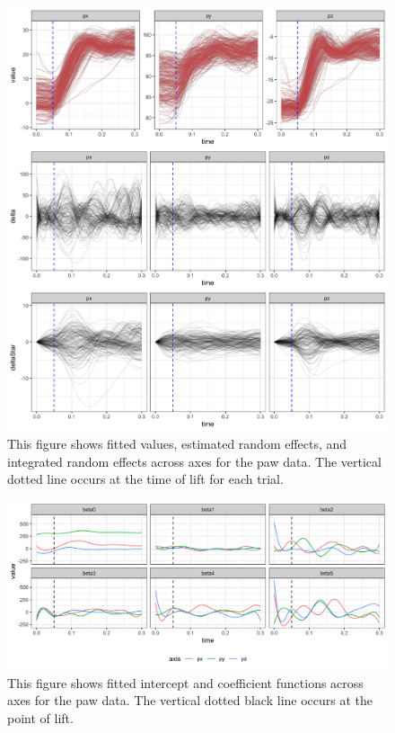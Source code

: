 \documentclass[preprint]{JASA}
\begin{document}
\begin{figure}
\includegraphics[width=\reprintcolumnwidth]{figs/fig_data_fits-1} \caption{This figure shows fitted values, estimated random effects, and integrated random effects across axes for the paw data. The vertical dotted line occurs at the time of lift for each trial.}\label{fig:paw_fits}
\end{figure}

\begin{figure}
\includegraphics[width=\reprintcolumnwidth]{figs/fig_data_beta-1} \caption{This figure shows fitted intercept and coefficient functions across axes for the paw data. The vertical dotted black line occurs at the point of lift.}\label{fig:paw_betas}
\end{figure}
\end{document}
